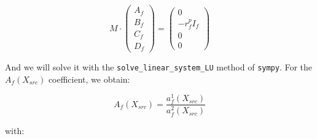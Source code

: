 \documentclass[colorlinks]{article}
\begin{document}
\begin{enumerate}
\begin{equation}
M \cdot
\begin{pmatrix}
    A_f \\
    B_f \\
    C_f \\
    D_f
\end{pmatrix} = 
\begin{pmatrix}
0 \\
- r_f^p I_f \\
0 \\
0
\end{pmatrix}
\end{equation}

And we will solve it with the \texttt{solve\_linear\_system\_LU} method of
\texttt{sympy}. For the $A_f(X_{src})$ coefficient, we obtain:

\begin{equation}
A_f(X_{src}) = \frac{a^1_f(X_{src})}{a^2_f(X_{src})}
\end{equation}

with:


\end{enumerate}
\end{document}
